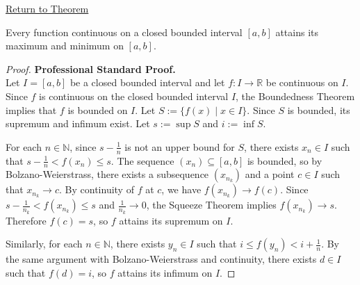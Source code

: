 \newpage
{}
\label{prf:maximum-minimum-theorem}

\begin{remark*}[Return]
\hyperref[thm:maximum-minimum-theorem]{Return to Theorem}
\end{remark*}

\begin{theorem*}
Every function continuous on a closed bounded interval $[a,b]$ attains its maximum and minimum on $[a,b]$.
\end{theorem*}

\begin{proof}
\textbf{Professional Standard Proof.}~\\
Let $I=[a,b]$ be a closed bounded interval and let $f : I \to \mathbb{R}$ be continuous on $I$. Since $f$ is continuous on the closed bounded interval $I$, the Boundedness Theorem implies that $f$ is bounded on $I$. Let $S:=\{f(x)\mid x\in I\}$. Since $S$ is bounded, its supremum and infimum exist. Let $s := \sup S$ and $i := \inf S$.

For each $n\in\mathbb{N}$, since $s-\frac{1}{n}$ is not an upper bound for $S$, there exists $x_n\in I$ such that $s-\frac{1}{n}<f(x_n)\le s$. The sequence $(x_n)\subseteq[a,b]$ is bounded, so by Bolzano-Weierstrass, there exists a subsequence $(x_{n_k})$ and a point $c\in I$ such that $x_{n_k}\to c$. By continuity of $f$ at $c$, we have $f(x_{n_k})\to f(c)$. Since $s-\frac{1}{n_k}<f(x_{n_k})\le s$ and $\frac{1}{n_k}\to 0$, the Squeeze Theorem implies $f(x_{n_k})\to s$. Therefore $f(c)=s$, so $f$ attains its supremum on $I$.

Similarly, for each $n\in\mathbb{N}$, there exists $y_n\in I$ such that $i\le f(y_n)<i+\frac{1}{n}$. By the same argument with Bolzano-Weierstrass and continuity, there exists $d\in I$ such that $f(d)=i$, so $f$ attains its infimum on $I$.
\end{proof}

